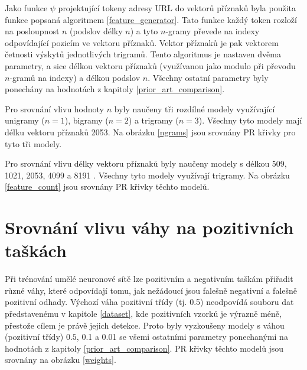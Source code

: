 Jako funkce \( \psi \) projektující tokeny adresy URL do vektorů příznaků byla použita funkce popsaná algoritmem \ref{feature_generator}. Tato funkce každý token rozloží na posloupnost \( n \) (podslov délky \( n \)) a tyto \( n \)-gramy převede na indexy odpovídající pozicím ve vektoru příznaků. Vektor příznaků je pak vektorem četnosti výskytů jednotlivých trigramů. Tento algoritmus je nastaven dvěma parametry, a sice délkou vektoru příznaků (využívanou jako modulo při převodu \( n \)-gramů na indexy) a délkou podslov \( n \). Všechny ostatní parametry byly ponechány na hodnotách z kapitoly \ref{prior_art_comparison}.

Pro srovnání vlivu hodnoty \( n \) byly naučeny tři rozdílné modely využívající unigramy (\( n = 1 \)), bigramy (\( n = 2 \))  a trigramy (\( n = 3 \)). Všechny tyto modely mají délku vektoru příznaků 2053. Na obrázku \ref{ngrams} jsou srovnány PR křivky pro tyto tři modely.


Pro srovnání vlivu délky vektoru příznaků byly naučeny modely s délkou 509, 1021, 2053, 4099 a 8191 . Všechny tyto modely využívají trigramy. Na obrázku \ref{feature_count} jsou srovnány PR křivky těchto modelů.


\section{Srovnání vlivu váhy na pozitivních taškách}
Při trénování umělé neuronové sítě lze pozitivním a negativním taškám přiřadit různé váhy, které odpovídají tomu, jak nežádoucí jsou falešně negativní a falešně pozitivní odhady. Výchozí váha pozitivní třídy (tj. 0.5) neodpovídá souboru dat představenému v kapitole \ref{dataset}, kde pozitivních vzorků je výrazně méně, přestože cílem je právě jejich detekce. Proto byly vyzkoušeny modely s váhou (pozitivní třídy) \( 0.5 \), 0.1 a 0.01 se všemi ostatními parametry ponechanými na hodnotách z kapitoly \ref{prior_art_comparison}. PR křivky těchto modelů jsou srovnány na obrázku \ref{weights}.

